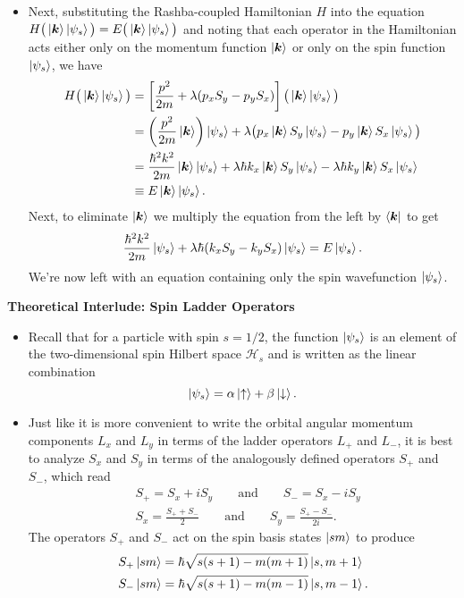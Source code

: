 \documentclass[11pt, a4paper]{article}
\newcommand{\eqtext}[1]{\qquad \text{#1} \qquad}
\renewcommand{\vec}[1]{\bm{#1}} %
\renewcommand{\H}{\mathcal{H}}  %
\newcommand{\ua}{\uparrow}  %
\newcommand{\da}{\downarrow}  %
\renewcommand{\k}{\vec{k}}  %
\begin{document}
\begin{itemize}
	\item Next, substituting the Rashba-coupled Hamiltonian $ H $ into the equation $ H\big(\ket{\k} \ket{\psi_{s}}\big) = E \big(\ket{\k} \ket{\psi_{s}}\big) $ and noting that each operator in the Hamiltonian acts either only on the momentum function $ \ket{\k} $ or only on the spin function $ \ket{\psi_{s}} $, we have
	\begin{align*}
		H\big(\ket{\k} \ket{\psi_{s}}\big) &= \left[\frac{p^{2}}{2m} + \lambda (p_{x}S_{y} - p_{y}S_{x})\right]\big(\ket{\k} \ket{\psi_{s}}\big) \\
		& = \left(\frac{p^{2}}{2m}\ket{\k}\right)\ket{\psi_{s}} + \lambda \big(p_{x}\ket{\k} S_{y}\ket{\psi_{s}} - p_{y}\ket{\k} S_{x}\ket{\psi_{s}}\big) \\
		&=\frac{\hbar^{2}k^{2}}{2m}\ket{\k}\ket{\psi_{s}} + \lambda \hbar k_{x}\ket{\k}S_{y}\ket{\psi_{s}} - \lambda \hbar k_{y}\ket{\k}S_{x}\ket{\psi_{s}}\\
		&\equiv E\ket{\k}\ket{\psi_{s}}.
	\end{align*}
	Next, to eliminate $ \ket{\k} $ we multiply the equation from the left by $ \bra{\k} $ to get
	\begin{equation*}
		\frac{\hbar^{2}k^{2}}{2m}\ket{\psi_{s}} + \lambda \hbar (k_{x}S_{y} - k_{y}S_{x})\ket{\psi_{s}} = E\ket{\psi_{s}}.
	\end{equation*}
	We're now left with an equation containing only the spin wavefunction $ \ket{\psi_{s}} $. 
\end{itemize}

\textbf{Theoretical Interlude: Spin Ladder Operators}
\begin{itemize}

	\item Recall that for a particle with spin $ s = 1/2 $, the function $ \ket{\psi_{s}} $ is an element of the two-dimensional spin Hilbert space $ \H_{s} $ and is written as the linear combination
	\begin{equation*}
		\ket{\psi_{s}} = \alpha \ket{\ua} + \beta \ket{\da}.
	\end{equation*}

	\item Just like it is more convenient to write the orbital angular momentum components $ L_{x} $ and $ L_{y} $ in terms of the ladder operators $ L_{+} $ and $ L_{-} $, it is best to analyze $ S_{x} $ and $ S_{y} $ in terms of the analogously defined operators $ S_{+} $ and $ S_{-} $, which read
	\begin{align*}
		& S_{+} = S_{x} + iS_{y} \eqtext{and} S_{-} = S_{x} - i S_{y}\\
		& S_{x} = \frac{S_{+}+S_{-}}{2} \eqtext{and} S_{y} = \frac{S_{+}-S_{-}}{2i}.
	\end{align*}
	The operators $ S_{+} $ and $ S_{-} $ act on the spin basis states $ \ket{sm} $ to produce
	\begin{align*}
		& S_{+} \ket{sm} = \hbar \sqrt{s(s+1) - m(m+1)}\ket{s, m+1}\\
		& S_{-} \ket{sm} = \hbar \sqrt{s(s+1) - m(m-1)}\ket{s, m-1}.
	\end{align*}
	
\end{itemize}
\end{document}
